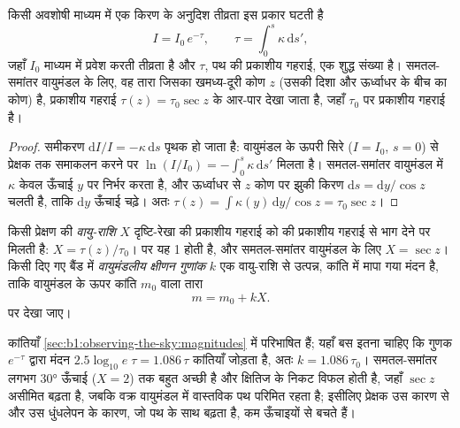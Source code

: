 \begin{proposition}[बूगे का नियम]\label{prop:b1:observing-the-sky:bouguer}
किसी अवशोषी माध्यम में एक किरण के अनुदिश तीव्रता इस प्रकार घटती है
\[
  I = I_0\,e^{-\tau}, \qquad \tau = \int_0^s \kappa\,\mathrm ds' ,
\]
जहाँ $I_0$ माध्यम में प्रवेश करती तीव्रता है और $\tau$, पथ की प्रकाशीय गहराई, एक शुद्ध संख्या है।
समतल-समांतर वायुमंडल के लिए, वह तारा जिसका खमध्य-दूरी कोण $z$ (उसकी दिशा और ऊर्ध्वाधर के बीच का
कोण) है, प्रकाशीय गहराई $\tau(z) = \tau_0\sec z$ के आर-पार देखा जाता है, जहाँ $\tau_0$  पर
प्रकाशीय गहराई है।
\end{proposition}

\begin{proof}
समीकरण $\mathrm dI/I = -\kappa\,\mathrm ds$ पृथक हो जाता है: वायुमंडल के ऊपरी सिरे
($I = I_0$, $s = 0$) से प्रेक्षक तक समाकलन करने पर
$\ln(I/I_0) = -\int_0^s\kappa\,\mathrm ds'$ मिलता है। समतल-समांतर वायुमंडल में
$\kappa$ केवल ऊँचाई $y$ पर निर्भर करता है, और ऊर्ध्वाधर से $z$ कोण पर झुकी किरण $\mathrm ds = \mathrm dy/\cos z$ चलती है, ताकि
$\mathrm dy$ ऊँचाई चढ़े। अतः
$\tau(z) = \int \kappa(y)\,\mathrm dy/\cos z = \tau_0\sec z$।
\end{proof}

\begin{definition}[वायु-राशि, वायुमंडलीय क्षीणन गुणांक]\label{def:b1:observing-the-sky:extinction}
किसी प्रेक्षण की \emph{वायु-राशि} $X$ दृष्टि-रेखा की प्रकाशीय गहराई को  की
प्रकाशीय गहराई से भाग देने पर मिलती है: $X = \tau(z)/\tau_0$।  पर यह 1 होती है, और समतल-समांतर
वायुमंडल के लिए $X = \sec z$। किसी दिए गए बैंड में \emph{वायुमंडलीय क्षीणन
गुणांक} $k$ एक वायु-राशि से उत्पन्न, कांति में मापा गया मंदन है,
ताकि वायुमंडल के ऊपर कांति $m_0$ वाला तारा
\[
  m = m_0 + kX .
\]
पर देखा जाए।
\end{definition}

कांतियाँ \cref{sec:b1:observing-the-sky:magnitudes} में परिभाषित हैं; यहाँ बस इतना चाहिए कि गुणक
$e^{-\tau}$ द्वारा मंदन $2.5\log_{10}e\;\tau = 1.086\,\tau$ कांतियाँ जोड़ता है, अतः $k = 1.086\,\tau_0$।
समतल-समांतर  लगभग \ang{30} ऊँचाई ($X = 2$) तक बहुत अच्छी है और क्षितिज के निकट विफल
होती है, जहाँ $\sec z$ असीमित बढ़ता है, जबकि वक्र वायुमंडल में वास्तविक पथ परिमित रहता है;
इसीलिए प्रेक्षक उस कारण से और उस धुंधलेपन के कारण, जो पथ के साथ बढ़ता है, कम ऊँचाइयों से बचते हैं।

